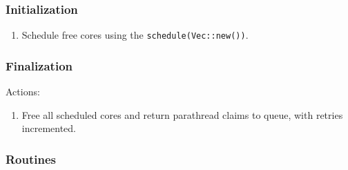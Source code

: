 \subsubsection{Initialization}

\begin{enumerate}
    \item Schedule free cores using the \verb|schedule(Vec::new())|.
\end{enumerate}

\subsubsection{Finalization}

Actions:

\begin{enumerate}
    \item Free all scheduled cores and return parathread claims to queue, with
    retries incremented.
\end{enumerate}

\subsubsection{Routines}


